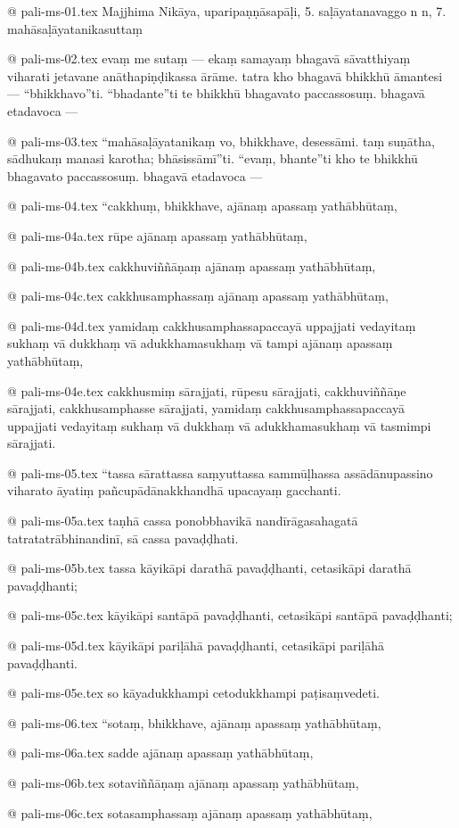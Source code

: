 @ pali-ms-01.tex
Majjhima Nikāya, uparipaṇṇāsapāḷi, 5. saḷāyatanavaggo n n, 7.
mahāsaḷāyatanikasuttaṃ

@ pali-ms-02.tex
evaṃ me sutaṃ — ekaṃ samayaṃ bhagavā sāvatthiyaṃ viharati jetavane anāthapiṇḍikassa ārāme. tatra kho bhagavā bhikkhū āmantesi — “bhikkhavo”ti. “bhadante”ti te bhikkhū bhagavato paccassosuṃ. bhagavā etadavoca —

@ pali-ms-03.tex
“mahāsaḷāyatanikaṃ vo, bhikkhave, desessāmi. taṃ suṇātha, sādhukaṃ manasi karotha; bhāsissāmī”ti. “evaṃ, bhante”ti kho te bhikkhū bhagavato paccassosuṃ. bhagavā etadavoca —

@ pali-ms-04.tex
“cakkhuṃ, bhikkhave, ajānaṃ apassaṃ yathābhūtaṃ,

@ pali-ms-04a.tex
rūpe ajānaṃ apassaṃ yathābhūtaṃ,

@ pali-ms-04b.tex
cakkhuviññāṇaṃ ajānaṃ apassaṃ yathābhūtaṃ,

@ pali-ms-04c.tex
cakkhusamphassaṃ ajānaṃ apassaṃ yathābhūtaṃ,

@ pali-ms-04d.tex
yamidaṃ cakkhusamphassapaccayā uppajjati vedayitaṃ sukhaṃ vā dukkhaṃ vā adukkhamasukhaṃ vā tampi ajānaṃ apassaṃ yathābhūtaṃ,

@ pali-ms-04e.tex
cakkhusmiṃ sārajjati, rūpesu sārajjati, cakkhuviññāṇe sārajjati, cakkhusamphasse sārajjati, yamidaṃ cakkhusamphassapaccayā uppajjati vedayitaṃ sukhaṃ vā dukkhaṃ vā adukkhamasukhaṃ vā tasmimpi sārajjati.

@ pali-ms-05.tex
“tassa sārattassa saṃyuttassa sammūḷhassa assādānupassino viharato āyatiṃ pañcupādānakkhandhā upacayaṃ gacchanti.

@ pali-ms-05a.tex
taṇhā cassa ponobbhavikā nandīrāgasahagatā tatratatrābhinandinī, sā cassa pavaḍḍhati.

@ pali-ms-05b.tex
tassa kāyikāpi darathā pavaḍḍhanti, cetasikāpi darathā pavaḍḍhanti;

@ pali-ms-05c.tex
kāyikāpi santāpā pavaḍḍhanti, cetasikāpi santāpā pavaḍḍhanti;

@ pali-ms-05d.tex
kāyikāpi pariḷāhā pavaḍḍhanti, cetasikāpi pariḷāhā pavaḍḍhanti.

@ pali-ms-05e.tex
so kāyadukkhampi cetodukkhampi paṭisaṃvedeti.

@ pali-ms-06.tex
“sotaṃ, bhikkhave, ajānaṃ apassaṃ yathābhūtaṃ,

@ pali-ms-06a.tex
sadde ajānaṃ apassaṃ yathābhūtaṃ,

@ pali-ms-06b.tex
sotaviññāṇaṃ ajānaṃ apassaṃ yathābhūtaṃ,

@ pali-ms-06c.tex
sotasamphassaṃ ajānaṃ apassaṃ yathābhūtaṃ,

